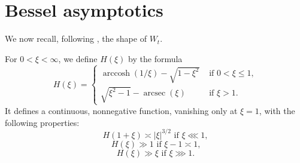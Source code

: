 \documentclass[reqno]{amsart} 
\begin{document}
\section{Bessel asymptotics}\label{sec:cqx50az4ip}
We now recall, following \cite[p 1527-1528]{MR3102912}, the shape of $W_t$.


For $0 < \xi < \infty$, we define $H(\xi)$ by the formula
\begin{equation*}
  H(\xi) =
  \begin{cases}
    \operatorname{arccosh}(1/ \xi)   - \sqrt{1 - \xi ^2 }  &  \text{ if } 0 < \xi \leq 1, \\
    \sqrt{\xi ^2 - 1} - \operatorname{arcsec}(\xi)                                               & \text{ if } \xi > 1.
  \end{cases}
\end{equation*}
It defines a continuous, nonnegative function, vanishing only at $\xi = 1$, with the following properties:
\begin{equation}\label{equation:H-near-critical}
  \text{$H(1 + \xi) \asymp |\xi|^{3/2}$ if $\xi \lll 1$},
\end{equation}
\begin{equation}\label{equation:H-in-bulk}
  \text{$H(\xi) \gg 1$ if $\xi - 1 \asymp 1$,}
\end{equation}
\begin{equation}\label{eqn:growth-of-H-at-infinity}
  \text{$H(\xi) \gg \xi$ if $\xi \ggg 1$.}
\end{equation}
\end{document}
